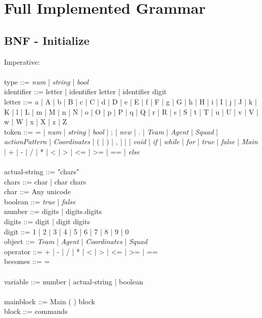 \chapter{Full Implemented Grammar}
\label{ap:fullgrammar}

\section{BNF - Initialize}

Imperative:\\
\\
type ::= \textit{num} | \textit{string} | \textit{bool}\\
identifier ::= letter | identifier letter | identifier digit\\
letter ::= a | A | b | B | c | C | d | D | e | E | f | F | g | G | h | H | i | I | j | J | k | K | l | L | m | M | n | N | o | O | p | P | q | Q | r | R | s | S | t | T | u | U | v | V | w | W | x | X | z | Z\\
token ::= = | \textit{num} | \textit{string} | \textit{bool} | ; | \textit{new} | . | \textit{Team} | \textit{Agent} | \textit{Squad} | \textit{actionPattern} | \textit{Coordinates}  | ( | ) | , | { | } | \textit{void} | \textit{if} | \textit{while} | \textit{for} | \textit{true} | \textit{false} | \textit{Main} | + | - | / | * | < | > | <= | >= | == | \textit{else}\\
\\
actual-string ::= "chars"\\
chars ::= char | char chars\\
char ::= Any unicode\\
boolean ::= \textit{true} | \textit{false}\\
number ::= digits | digits.digits\\
digits ::= digit | digit digits\\
digit ::= 1 | 2 | 3 | 4 | 5 | 6 | 7 | 8 | 9 | 0\\
object ::= \textit{Team} | \textit{Agent} | \textit{Coordinates} | \textit{Squad}\\
operator ::= + | - | / | * | < | > | <= | >= | ==\\
becomes ::= =\\
\\
variable ::= number | actual-string | boolean\\
\\
mainblock ::= Main ( ) block\\
block ::= { commands }\\
\\
